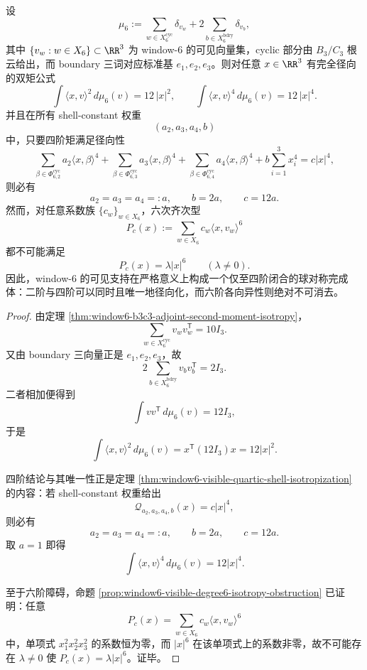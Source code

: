 \begin{theorem}\label{thm:conclusion-window6-visible-support-quartic-closure-sixth-obstruction}
设
\[
\mu_6
:=
\sum_{w\in X_6^{\mathrm{cyc}}}\delta_{v_w}
+2\sum_{b\in X_6^{\mathrm{bdry}}}\delta_{v_b},
\]
其中 \(\{v_w:w\in X_6\}\subset \RR^3\) 为 window-\(6\) 的可见向量集，cyclic 部分由 \(B_3/C_3\) 根云给出，而 boundary 三词对应标准基 \(e_1,e_2,e_3\)。则对任意 \(x\in \RR^3\) 有完全径向的双矩公式
\[
\int \langle x,v\rangle^2\,d\mu_6(v)=12\,|x|^2,
\qquad
\int \langle x,v\rangle^4\,d\mu_6(v)=12\,|x|^4.
\]
并且在所有 shell-constant 权重
\[
(a_2,a_3,a_4,b)
\]
中，只要四阶矩满足径向性
\[
\sum_{\beta\in\Phi_{6,2}^{\mathrm{cyc}}}a_2\langle x,\beta\rangle^4
+\sum_{\beta\in\Phi_{6,3}^{\mathrm{cyc}}}a_3\langle x,\beta\rangle^4
+\sum_{\beta\in\Phi_{6,4}^{\mathrm{cyc}}}a_4\langle x,\beta\rangle^4
+b\sum_{i=1}^3x_i^4
=
c|x|^4,
\]
则必有
\[
a_2=a_3=a_4=:a,
\qquad
b=2a,
\qquad
c=12a.
\]
然而，对任意系数族 \(\{c_w\}_{w\in X_6}\)，六次齐次型
\[
P_c(x):=\sum_{w\in X_6}c_w\langle x,v_w\rangle^6
\]
都不可能满足
\[
P_c(x)=\lambda |x|^6
\qquad (\lambda\neq 0).
\]
因此，window-\(6\) 的可见支持在严格意义上构成一个仅至四阶闭合的球对称完成体：二阶与四阶可以同时且唯一地径向化，而六阶各向异性则绝对不可消去。
\end{theorem}
\begin{proof}
由定理 \ref{thm:window6-b3c3-adjoint-second-moment-isotropy}，
\[
\sum_{w\in X_6^{\mathrm{cyc}}}v_wv_w^{\mathsf T}=10I_3.
\]
又由 boundary 三向量正是 \(e_1,e_2,e_3\)，故
\[
2\sum_{b\in X_6^{\mathrm{bdry}}}v_bv_b^{\mathsf T}=2I_3.
\]
二者相加便得到
\[
\int vv^{\mathsf T}\,d\mu_6(v)=12I_3,
\]
于是
\[
\int \langle x,v\rangle^2\,d\mu_6(v)=x^{\mathsf T}(12I_3)x=12|x|^2.
\]

四阶结论与其唯一性正是定理 \ref{thm:window6-visible-quartic-shell-isotropization} 的内容：若 shell-constant 权重给出
\[
\mathcal Q_{a_2,a_3,a_4,b}(x)=c|x|^4,
\]
则必有
\[
a_2=a_3=a_4=:a,\qquad b=2a,\qquad c=12a.
\]
取 \(a=1\) 即得
\[
\int \langle x,v\rangle^4\,d\mu_6(v)=12|x|^4.
\]

至于六阶障碍，命题 \ref{prop:window6-visible-degree6-isotropy-obstruction} 已证明：任意
\[
P_c(x)=\sum_{w\in X_6}c_w\langle x,v_w\rangle^6
\]
中，单项式 \(x_1^2x_2^2x_3^2\) 的系数恒为零，而 \(|x|^6\) 在该单项式上的系数非零，故不可能存在 \(\lambda\neq 0\) 使 \(P_c(x)=\lambda |x|^6\)。证毕。
\end{proof}

